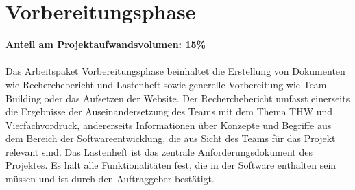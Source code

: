 \section{Vorbereitungsphase}
\textbf{Anteil am Projektaufwandsvolumen: 15\%}\\ \\
Das Arbeitspaket Vorbereitungsphase beinhaltet die Erstellung von Dokumenten 
wie Recherchebericht und Lastenheft sowie generelle Vorbereitung wie Team
-Building oder das Aufsetzen der Website.
Der Recherchebericht umfasst einerseits die Ergebnisse der Auseinandersetzung 
des Teams mit dem Thema THW und Vierfachvordruck, andererseits Informationen 
über Konzepte und Begriffe aus dem Bereich der Softwareentwicklung, die aus 
Sicht des Teams für das Projekt relevant sind.
Das Lastenheft ist das zentrale Anforderungsdokument des Projektes. Es hält 
alle Funktionalitäten fest, die in der Software enthalten sein müssen und 
ist durch den Auftraggeber bestätigt.


